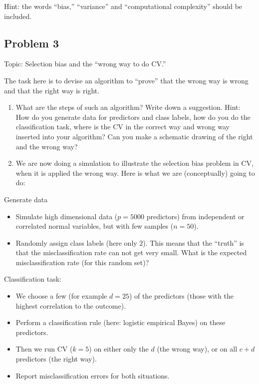 \documentclass[
]{article}
\providecommand{\tightlist}{%
  \setlength{\itemsep}{0pt}\setlength{\parskip}{0pt}}
\begin{document}
Hint: the words ``bias,'' ``variance'' and ``computational complexity''
should be included.

\hypertarget{problem-3}{%
\subsection{Problem 3}\label{problem-3}}

Topic: Selection bias and the ``wrong way to do CV.''

The task here is to devise an algorithm to ``prove'' that the wrong way
is wrong and that the right way is right.

\begin{enumerate}
\def\labelenumi{\alph{enumi})}
\item
  What are the steps of such an algorithm? Write down a suggestion.
  Hint: How do you generate data for predictors and class labels, how do
  you do the classification task, where is the CV in the correct way and
  wrong way inserted into your algorithm? Can you make a schematic
  drawing of the right and the wrong way?
\item
  We are now doing a simulation to illustrate the selection bias problem
  in CV, when it is applied the wrong way. Here is what we are
  (conceptually) going to do:
\end{enumerate}

Generate data

\begin{itemize}
\item
  Simulate high dimensional data (\(p = 5000\) predictors) from
  independent or correlated normal variables, but with few samples
  (\(n = 50\)).
\item
  Randomly assign class labels (here only \(2\)). This means that the
  ``truth'' is that the misclassification rate can not get very small.
  What is the expected misclassification rate (for this random set)?
\end{itemize}

Classification task:

\begin{itemize}
\tightlist
\item
  We choose a few (for example \(d = 25\)) of the predictors (those with
  the highest correlation to the outcome).
\item
  Perform a classification rule (here: logistic empirical Bayes) on
  these predictors.
\item
  Then we run CV (\(k = 5\)) on either only the \(d\) (the wrong way),
  or on all \(c + d\) predictors (the right way).
\item
  Report misclassification errors for both situations.
\end{itemize}
\end{document}
